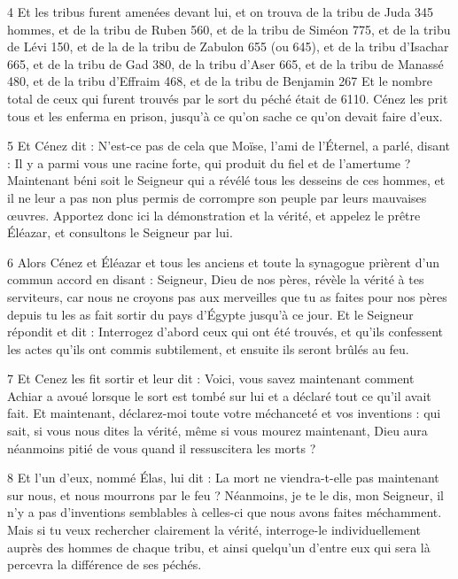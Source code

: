\par 4 Et les tribus furent amenées devant lui, et on trouva de la tribu de Juda 345 hommes, et de la tribu de Ruben 560, et de la tribu de Siméon 775, et de la tribu de Lévi 150, et de la de la tribu de Zabulon 655 (ou 645), et de la tribu d'Isachar 665, et de la tribu de Gad 380, de la tribu d'Aser 665, et de la tribu de Manassé 480, et de la tribu d'Effraim 468, et de la tribu de Benjamin 267 Et le nombre total de ceux qui furent trouvés par le sort du péché était de 6110. Cénez les prit tous et les enferma en prison, jusqu'à ce qu'on sache ce qu'on devait faire d'eux.

\par 5 Et Cénez dit : N'est-ce pas de cela que Moïse, l'ami de l'Éternel, a parlé, disant : Il y a parmi vous une racine forte, qui produit du fiel et de l'amertume ? Maintenant béni soit le Seigneur qui a révélé tous les desseins de ces hommes, et il ne leur a pas non plus permis de corrompre son peuple par leurs mauvaises œuvres. Apportez donc ici la démonstration et la vérité, et appelez le prêtre Éléazar, et consultons le Seigneur par lui.

\par 6 Alors Cénez et Éléazar et tous les anciens et toute la synagogue prièrent d'un commun accord en disant : Seigneur, Dieu de nos pères, révèle la vérité à tes serviteurs, car nous ne croyons pas aux merveilles que tu as faites pour nos pères depuis tu les as fait sortir du pays d'Égypte jusqu'à ce jour. Et le Seigneur répondit et dit : Interrogez d'abord ceux qui ont été trouvés, et qu'ils confessent les actes qu'ils ont commis subtilement, et ensuite ils seront brûlés au feu.

\par 7 Et Cenez les fit sortir et leur dit : Voici, vous savez maintenant comment Achiar a avoué lorsque le sort est tombé sur lui et a déclaré tout ce qu'il avait fait. Et maintenant, déclarez-moi toute votre méchanceté et vos inventions : qui sait, si vous nous dites la vérité, même si vous mourez maintenant, Dieu aura néanmoins pitié de vous quand il ressuscitera les morts ?

\par 8 Et l'un d'eux, nommé Élas, lui dit : La mort ne viendra-t-elle pas maintenant sur nous, et nous mourrons par le feu ? Néanmoins, je te le dis, mon Seigneur, il n'y a pas d'inventions semblables à celles-ci que nous avons faites méchamment. Mais si tu veux rechercher clairement la vérité, interroge-le individuellement auprès des hommes de chaque tribu, et ainsi quelqu'un d'entre eux qui sera là percevra la différence de ses péchés.

